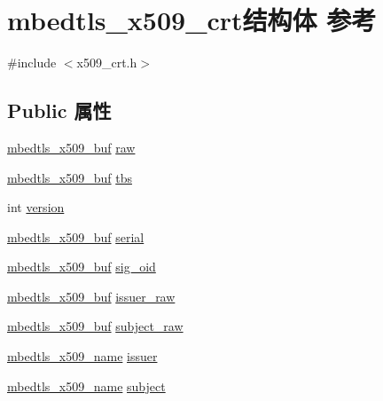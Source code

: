 \hypertarget{structmbedtls__x509__crt}{}\section{mbedtls\+\_\+x509\+\_\+crt结构体 参考}
\label{structmbedtls__x509__crt}


{\ttfamily \#include $<$x509\+\_\+crt.\+h$>$}

\subsection*{Public 属性}
\begin{DoxyCompactItemize}
\item 
\hyperlink{group__x509__module_ga4d02c9e8e4e2934555e0d132cd2976dc}{mbedtls\+\_\+x509\+\_\+buf} \hyperlink{structmbedtls__x509__crt_a5bfef6b8b81bc081f796cb1f6bb28839}{raw}
\item 
\hyperlink{group__x509__module_ga4d02c9e8e4e2934555e0d132cd2976dc}{mbedtls\+\_\+x509\+\_\+buf} \hyperlink{structmbedtls__x509__crt_a44e9a884baad5737ef0930af94ca3f94}{tbs}
\item 
int \hyperlink{structmbedtls__x509__crt_a879ea07a05ab857c0f5793572bf1696e}{version}
\item 
\hyperlink{group__x509__module_ga4d02c9e8e4e2934555e0d132cd2976dc}{mbedtls\+\_\+x509\+\_\+buf} \hyperlink{structmbedtls__x509__crt_a5c3ae8b4aba6e1c40cb1f6a85da36116}{serial}
\item 
\hyperlink{group__x509__module_ga4d02c9e8e4e2934555e0d132cd2976dc}{mbedtls\+\_\+x509\+\_\+buf} \hyperlink{structmbedtls__x509__crt_a128c3a665ffdce696b402435a74e97aa}{sig\+\_\+oid}
\item 
\hyperlink{group__x509__module_ga4d02c9e8e4e2934555e0d132cd2976dc}{mbedtls\+\_\+x509\+\_\+buf} \hyperlink{structmbedtls__x509__crt_afb876a6a7b85e160620c4549324d9e8d}{issuer\+\_\+raw}
\item 
\hyperlink{group__x509__module_ga4d02c9e8e4e2934555e0d132cd2976dc}{mbedtls\+\_\+x509\+\_\+buf} \hyperlink{structmbedtls__x509__crt_ac30aeab20c2cdf74dae631d6d0691651}{subject\+\_\+raw}
\item 
\hyperlink{group__x509__module_ga2272228c7776102328df31623af3168c}{mbedtls\+\_\+x509\+\_\+name} \hyperlink{structmbedtls__x509__crt_ade48d67edd24629e28361d3fbc0aafd9}{issuer}
\item 
\hyperlink{group__x509__module_ga2272228c7776102328df31623af3168c}{mbedtls\+\_\+x509\+\_\+name} \hyperlink{structmbedtls__x509__crt_a773e92423092ab65e5e50031bd9663a5}{subject}

\end{DoxyCompactItemize}
